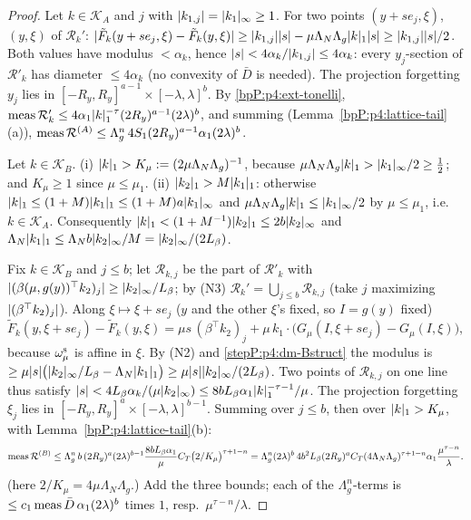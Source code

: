 \begin{proof}
\label{stepP:p4:dm-A}
Let $k\in\mathcal K_A$ and $j$ with $\lvert k_{1,j}\rvert=\lvert k_1\rvert_\infty\ge1$. For two points $(y+se_j,\xi)$, $(y,\xi)$ of $\mathcal R_k'$:
$\lvert \tilde F_k(y+se_j,\xi)-\tilde F_k(y,\xi)\rvert\ge\lvert k_{1,j}\rvert\lvert s\rvert-\mu\Lambda_N\Lambda_g\lvert k\rvert_1\lvert s\rvert\ge\lvert k_{1,j}\rvert\lvert s\rvert/2$. Both values have modulus $<\alpha_k$, hence $\lvert s\rvert<4\alpha_k/\lvert k_{1,j}\rvert\le4\alpha_k$: every $y_j$-section of $\mathcal R'_k$ has diameter $\le4\alpha_k$ (no convexity of $\bar D$ is needed). The projection forgetting $y_j$ lies in $[-R_y,R_y]^{a-1}\times[-\lambda,\lambda]^b$. By \ref{bpP:p4:ext-tonelli}, $\operatorname{meas}\mathcal R_k'\le4\alpha_1\lvert k\rvert_1^{-\tau}(2R_y)^{a-1}(2\lambda)^b$, and summing (Lemma~\ref{bpP:p4:lattice-tail}(a)),
$\operatorname{meas}\mathcal R^{(A)}\le\Lambda_g^n\,4S_1(2R_y)^{a-1}\alpha_1(2\lambda)^b$.

\label{stepP:p4:dm-Bstruct}
Let $k\in\mathcal K_B$. (i) $\lvert k\rvert_1>K_\mu:=(2\mu\Lambda_N\Lambda_g)^{-1}$, because $\mu\Lambda_N\Lambda_g\lvert k\rvert_1>\lvert k_1\rvert_\infty/2\ge\frac12$; and $K_\mu\ge1$ since $\mu\le\mu_1$. (ii) $\lvert k_2\rvert_1>M\lvert k_1\rvert_1$: otherwise $\lvert k\rvert_1\le(1+M)\lvert k_1\rvert_1\le(1+M)a\lvert k_1\rvert_\infty$ and $\mu\Lambda_N\Lambda_g\lvert k\rvert_1\le\lvert k_1\rvert_\infty/2$ by $\mu\le\mu_1$, i.e.\ $k\in\mathcal K_A$. Consequently $\lvert k\rvert_1<(1+M^{-1})\lvert k_2\rvert_1\le2b\lvert k_2\rvert_\infty$ and $\Lambda_N\lvert k_1\rvert_1\le\Lambda_Nb\lvert k_2\rvert_\infty/M=\lvert k_2\rvert_\infty/(2L_\beta)$.

\label{stepP:p4:dm-B}
Fix $k\in\mathcal K_B$ and $j\le b$; let $\mathcal R_{k,j}$ be the part of $\mathcal R'_k$ with $\lvert (\beta(\mu,g(y))^\top k_2)_j\rvert\ge\lvert k_2\rvert_\infty/L_\beta$; by (N3) $\mathcal R_k'=\bigcup_{j\le b}\mathcal R_{k,j}$ (take $j$ maximizing $\lvert (\beta^\top k_2)_j\rvert$). Along $\xi\mapsto\xi+se_j$ ($y$ and the other $\xi$'s fixed, so $I=g(y)$ fixed)
\[\tilde F_k(y,\xi+se_j)-\tilde F_k(y,\xi)=\mu s\,(\beta^\top k_2)_j+\mu\,k_1\cdot\bigl(G_\mu(I,\xi+se_j)-G_\mu(I,\xi)\bigr),\]
because $\omega_\mu^{\rm s}$ is affine in $\xi$. By (N2) and \ref{stepP:p4:dm-Bstruct} the modulus is $\ge\mu\lvert s\rvert\bigl(\lvert k_2\rvert_\infty/L_\beta-\Lambda_N\lvert k_1\rvert_1\bigr)\ge\mu\lvert s\rvert\lvert k_2\rvert_\infty/(2L_\beta)$. Two points of $\mathcal R_{k,j}$ on one line thus satisfy $\lvert s\rvert<4L_\beta\alpha_k/(\mu\lvert k_2\rvert_\infty)\le8bL_\beta\alpha_1\lvert k\rvert_1^{-\tau-1}/\mu$. The projection forgetting $\xi_j$ lies in $[-R_y,R_y]^a\times[-\lambda,\lambda]^{b-1}$. Summing over $j\le b$, then over $\lvert k\rvert_1>K_\mu$, with Lemma~\ref{bpP:p4:lattice-tail}(b):
\[\operatorname{meas}\mathcal R^{(B)}\le\Lambda_g^n\,b\,(2R_y)^a(2\lambda)^{b-1}\frac{8bL_\beta\alpha_1}{\mu}C_T\bigl(2/K_\mu\bigr)^{\tau+1-n}=\Lambda_g^n(2\lambda)^b\,4b^2L_\beta(2R_y)^aC_T(4\Lambda_N\Lambda_g)^{\tau+1-n}\alpha_1\frac{\mu^{\tau-n}}{\lambda}.\]
(here $2/K_\mu=4\mu\Lambda_N\Lambda_g$.)
\label{stepP:p4:dm-sum}
Add the three bounds; each of the $\Lambda_g^n$-terms is $\le c_1\operatorname{meas}\bar D\,\alpha_1(2\lambda)^b$ times $1$, resp.\ $\mu^{\tau-n}/\lambda$.
\end{proof}

